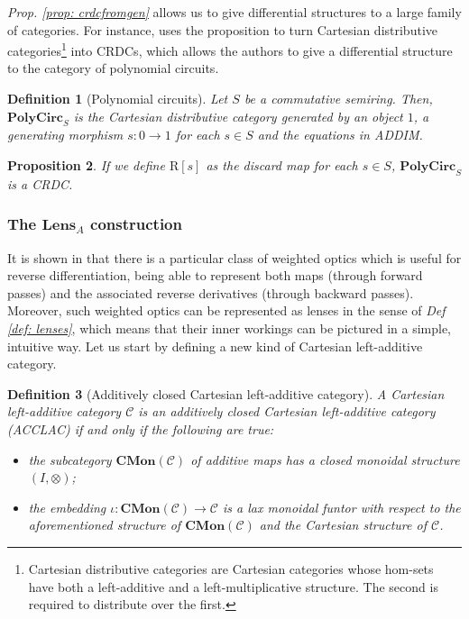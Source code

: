 \documentclass[12pt,a4paper,openright,twoside]{report}
\theoremstyle{plain}
\newtheorem{proposition}{Proposition}
\newtheorem{definition}[proposition]{Definition}
\theoremstyle{definition}
\begin{document}
\textit{Prop. \ref{prop: crdcfromgen}} allows us to give differential structures to a large family of categories. For instance, \cite{wilson2022categories} uses the proposition to turn Cartesian distributive categories\footnote{Cartesian distributive categories are Cartesian categories whose hom-sets have both a left-additive and a left-multiplicative structure. The second is required to distribute over the first.} into CRDCs, which allows the authors to give a differential structure to the category of polynomial circuits.


\begin{definition}[Polynomial circuits]
  \label{def: polycirc}
  Let $S$ be a commutative semiring. Then, $\mathbf{PolyCirc}_S$ is the Cartesian distributive category generated by an object $1$, a generating morphism $s: 0 \to 1$ for each $s \in S$ and the equations in ADDIM.
\end{definition}

\begin{proposition}
  If we define $\mathrm{R}[s]$ as the discard map for each $s \in S$, $\mathbf{PolyCirc}_S$ is a CRDC.
\end{proposition}


\subsubsection{The $\mathbf{Lens}_A$ construction}


It is shown in \cite{gavranovic2024fundamental} that there is a particular class of weighted optics which is useful for reverse differentiation, being able to represent both maps (through forward passes) and the associated reverse derivatives (through backward passes). Moreover, such weighted optics can be represented as lenses in the sense of \textit{Def \ref{def: lenses}}, which means that their inner workings can be pictured in a simple, intuitive way.
Let us start by defining a new kind of Cartesian left-additive category.


\begin{definition}[Additively closed Cartesian left-additive category]
  A Cartesian left-additive category $\mathcal{C}$ is an additively closed Cartesian left-additive category (ACCLAC) if and only if the following are true:
  \begin{itemize}
    \item the subcategory $\mathbf{CMon}(\mathcal{C})$ of additive maps has a closed monoidal structure $(I, \otimes)$;
    \item the embedding $\iota: \mathbf{CMon}(\mathcal{C}) \to \mathcal{C}$ is a lax monoidal funtor with respect to the aforementioned structure of $\mathbf{CMon}(\mathcal{C})$ and the Cartesian structure of $\mathcal{C}$.
  \end{itemize}
\end{definition}
\end{document}
